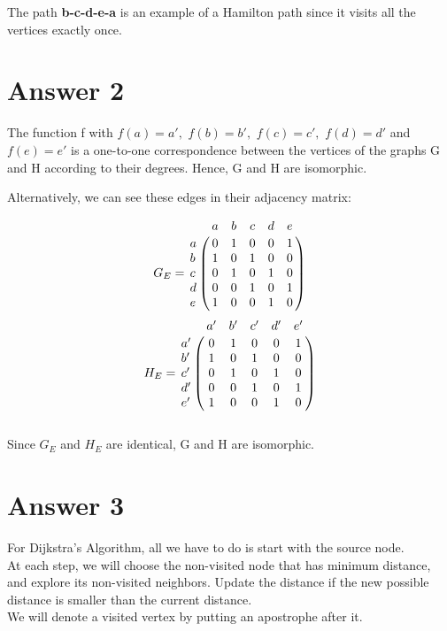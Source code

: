 \documentclass[12pt]{article}
\begin{document}
The path \textbf{b-c-d-e-a} is an example of a Hamilton path since it visits all the vertices exactly once. 

\section*{Answer 2}

The function f with $f(a) = a',$ $f (b) = b',$ $f (c) = c',$ $f(d) = d'$ and $f(e) = e'$ is a one-to-one correspondence between the vertices of the graphs G and H according to their degrees. Hence, G and H are isomorphic.

Alternatively,  we can see these edges in their adjacency matrix:

\begin{equation}
\begin{matrix} 
G_E = 
\end{matrix}\,
\bordermatrix{     
    & a&b&c&d&e\cr
    a&0&1&0&0&1\cr
    b&1&0&1&0&0\cr
    c&0&1&0&1&0\cr
    d&0&0&1&0&1\cr
    e&1&0&0&1&0\cr
}
\end{equation}
\begin{equation}
\begin{matrix} 
H_E = 
\end{matrix}\,
\bordermatrix{     
    & a'&b'&c'&d'&e'\cr
    a'&0&1&0&0&1\cr
    b'&1&0&1&0&0\cr
    c'&0&1&0&1&0\cr
    d'&0&0&1&0&1\cr
    e'&1&0&0&1&0\cr
}
\end{equation}
\\Since $G_E$ and $H_E$ are identical, G and H are isomorphic.

\section*{Answer 3}

For Dijkstra's Algorithm, all we have to do is start with the source node. \\

At each step, we will choose the non-visited node that has minimum distance, and explore its non-visited neighbors. Update the distance if the new possible distance is smaller than the current distance.\\

We will denote a visited vertex by putting an apostrophe after it.\\
\end{document}
